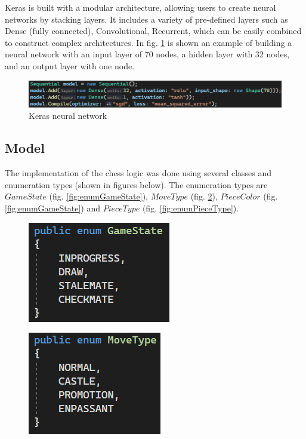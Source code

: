 Keras is built with a modular architecture, allowing users to create neural networks by stacking layers. It includes a variety of pre-defined layers such as Dense (fully connected), Convolutional, Recurrent, which can be easily combined to construct complex architectures. In fig. \ref{fig:kerasModel} is shown an example of building a neural network with an input layer of 70 nodes, a hidden layer with 32 nodes, and an output layer with one node.

\begin{figure}[h]
    \centering
    \includegraphics[width=1\textwidth]{figures/keras-model.png}
    \caption{Keras neural network}
    \label{fig:kerasModel}
\end{figure}

\subsection{Model}
\label{subsec:ch5sec1subsec2}

The implementation of the chess logic was done using several classes and enumeration types (shown in figures below). The enumeration types are $GameState$ (fig. \ref{fig:enumGameState}), $MoveType$ (fig. \ref{fig:enumMoveType}), $PieceColor$ (fig. \ref{fig:enumGameState}) and $PieceType$ (fig. \ref{fig:enumPieceType}).

\begin{figure}[h]
    \centering
    \begin{minipage}{.49\textwidth}
      \centering
      \includegraphics{figures/enum-game-state.png}
      \label{fig:enumGameState}
    \end{minipage}
    \begin{minipage}{.49\textwidth}
      \centering
      \includegraphics{figures/enum-move-type.png}
      \label{fig:enumMoveType}
    \end{minipage}
\end{figure}

